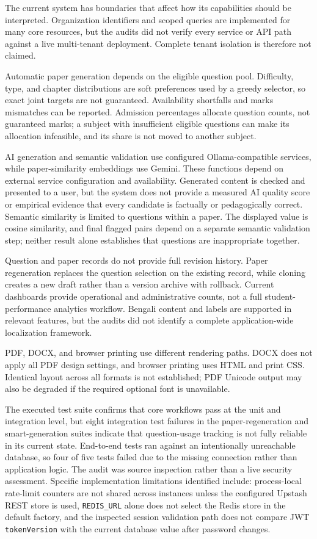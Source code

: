 The current system has boundaries that affect how its capabilities should be interpreted. Organization identifiers and scoped queries are implemented for many core resources, but the audits did not verify every service or API path against a live multi-tenant deployment. Complete tenant isolation is therefore not claimed.

Automatic paper generation depends on the eligible question pool. Difficulty, type, and chapter distributions are soft preferences used by a greedy selector, so exact joint targets are not guaranteed. Availability shortfalls and marks mismatches can be reported. Admission percentages allocate question counts, not guaranteed marks; a subject with insufficient eligible questions can make its allocation infeasible, and its share is not moved to another subject.

AI generation and semantic validation use configured Ollama-compatible services, while paper-similarity embeddings use Gemini. These functions depend on external service configuration and availability. Generated content is checked and presented to a user, but the system does not provide a measured AI quality score or empirical evidence that every candidate is factually or pedagogically correct. Semantic similarity is limited to questions within a paper. The displayed value is cosine similarity, and final flagged pairs depend on a separate semantic validation step; neither result alone establishes that questions are inappropriate together.

Question and paper records do not provide full revision history. Paper regeneration replaces the question selection on the existing record, while cloning creates a new draft rather than a version archive with rollback. Current dashboards provide operational and administrative counts, not a full student-performance analytics workflow. Bengali content and labels are supported in relevant features, but the audits did not identify a complete application-wide localization framework.

PDF, DOCX, and browser printing use different rendering paths. DOCX does not apply all PDF design settings, and browser printing uses HTML and print CSS. Identical layout across all formats is not established; PDF Unicode output may also be degraded if the required optional font is unavailable.

The executed test suite confirms that core workflows pass at the unit and integration level, but eight integration test failures in the paper-regeneration and smart-generation suites indicate that question-usage tracking is not fully reliable in its current state. End-to-end tests ran against an intentionally unreachable database, so four of five tests failed due to the missing connection rather than application logic. The audit was source inspection rather than a live security assessment. Specific implementation limitations identified include: process-local rate-limit counters are not shared across instances unless the configured Upstash REST store is used, \texttt{REDIS\_URL} alone does not select the Redis store in the default factory, and the inspected session validation path does not compare JWT \texttt{tokenVersion} with the current database value after password changes.

